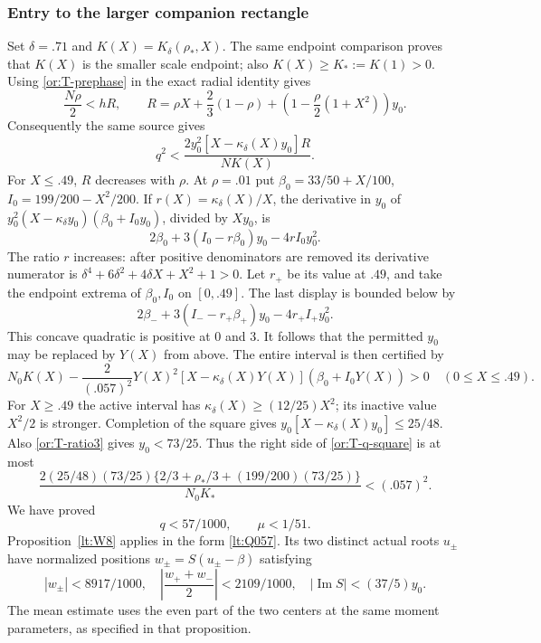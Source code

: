 \documentclass[11pt,reqno]{amsart}
\numberwithin{equation}{section}
\theoremstyle{definition}
\theoremstyle{remark}
\renewcommand{\Im}{\operatorname{Im}}
\begin{document}
\subsubsection{Entry to the larger companion rectangle}

Set $\delta=.71$ and $K(X)=K_\delta(\rho_*,X)$.
The same endpoint comparison proves that $K(X)$ is the smaller
scale endpoint; also $K(X)\ge K_*:=K(1)>0$.
Using \eqref{or:T-prephase} in the exact radial identity gives
\[
 \frac{N\rho}{2}<hR,\qquad
 R=\rho X+\frac23(1-\rho)
                   +\left(1-\frac\rho2(1+X^2)\right)y_0.
\]
Consequently the same source gives
\begin{equation}\label{or:T-q-square}
 q^2<\frac{2y_0^2[X-\kappa_\delta(X)y_0]R}{NK(X)}.
\end{equation}
For $X\le.49$, $R$ decreases with $\rho$.  At $\rho=.01$ put
$\beta_0=33/50+X/100$, $I_0=199/200-X^2/200$.
If $r(X)=\kappa_\delta(X)/X$, the derivative in $y_0$ of
$y_0^2(X-\kappa_\delta y_0)(\beta_0+I_0y_0)$, divided by $Xy_0$,
is
\[
       2\beta_0+3(I_0-r\beta_0)y_0-4rI_0y_0^2.
\]
The ratio $r$ increases: after positive denominators are removed
its derivative numerator is
$\delta^4+6\delta^2+4\delta X+X^2+1>0$.
Let $r_+$ be its value at $.49$, and take the endpoint extrema of
$\beta_0,I_0$ on $[0,.49]$.  The last display is bounded below by
\[
 2\beta_-+3(I_--r_+\beta_+)y_0-4r_+I_+y_0^2.
\]
This concave quadratic is positive at $0$ and $3$.  It follows that
the permitted $y_0$ may be replaced by $Y(X)$ from above.  The entire
interval is then certified by
\begin{equation}\label{or:T-q-low-poly}
 N_0K(X)-\frac{2}{(.057)^2}Y(X)^2
       [X-\kappa_\delta(X)Y(X)](\beta_0+I_0Y(X))>0
                   \quad(0\le X\le.49).
\end{equation}
For $X\ge.49$ the active interval has
$\kappa_\delta(X)\ge(12/25)X^2$; its inactive value $X^2/2$ is
stronger.  Completion of the square gives
$y_0[X-\kappa_\delta(X)y_0]\le25/48$.
Also \eqref{or:T-ratio3} gives $y_0<73/25$.
Thus the right side of \eqref{or:T-q-square} is at most
\[
 \frac{2(25/48)(73/25)
       \{2/3+\rho_*/3+(199/200)(73/25)\}}{N_0K_*}<(.057)^2.
\]
We have proved
\begin{equation}\label{or:T-Q057-entry}
                            q<57/1000,\qquad \mu<1/51.
\end{equation}
Proposition~\ref{lt:W8} applies in the form \eqref{lt:Q057}.
Its two distinct actual roots
$u_\pm$ have normalized positions $w_\pm=S(u_\pm-\beta)$ satisfying
\begin{equation}\label{or:T-Q057-pair}
 |w_\pm|<8917/1000,\quad
 \left|\frac{w_++w_-}{2}\right|<2109/1000,\quad
                         |\Im S|<(37/5)y_0.
\end{equation}
The mean estimate uses the even part of the two centers at the same
moment parameters, as specified in that proposition.
\end{document}
